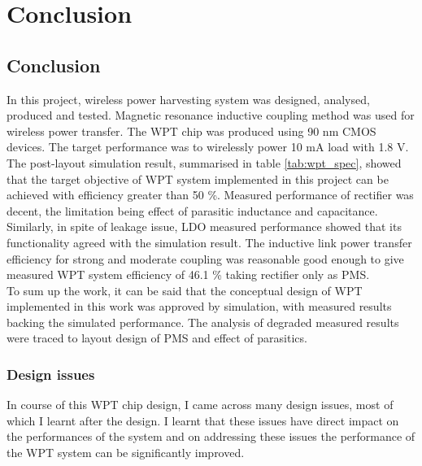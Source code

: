 \documentclass[12pt,a4paper,UKenglish]{report}
\begin{document}
\part{Conclusion}
\chapter{Conclusion}
In this project, wireless power harvesting system was designed, analysed, produced and tested. Magnetic resonance inductive coupling method was used for 
wireless power transfer. The WPT chip was produced using 90 nm CMOS devices. The target performance was to wirelessly power 10 mA load with 1.8 V.   \\

The post-layout simulation result, summarised in table \ref{tab:wpt_spec}, showed that the target objective of WPT system implemented in this project can be achieved with efficiency greater than 50 \%. Measured performance of rectifier was decent, the limitation being effect of parasitic inductance and capacitance.  Similarly, in spite of leakage issue, LDO measured performance showed that its functionality agreed with the simulation result. The inductive link power transfer efficiency for strong and moderate coupling was reasonable good enough to give measured WPT system efficiency of 46.1 \% taking rectifier only as PMS. \\

 To sum up the work, it can be said that the conceptual design of WPT implemented in this work was approved by simulation,  with measured results backing the simulated performance. The analysis of degraded measured results were traced to layout design of PMS and effect of parasitics. \\

\section{Design issues}

In course of this WPT chip design, I came across many design issues, most of which I learnt after the design. I learnt that these issues have direct impact on the performances of the system and on addressing these issues the performance of the WPT system can be significantly improved.
\end{document}
